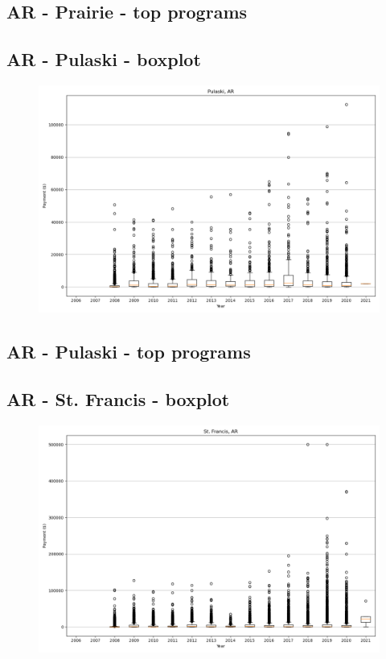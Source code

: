 \subsection*{AR - Prairie - top programs}

\newpage
\subsection*{AR - Pulaski - boxplot}
\begin{figure}[h]
\centering
\includegraphics[width=7in]{../output/boxplots/counties/Pulaski-AR_boxplot.png}
\end{figure}


\subsection*{AR - Pulaski - top programs}

\newpage
\subsection*{AR - St. Francis - boxplot}
\begin{figure}[h]
\centering
\includegraphics[width=7in]{../output/boxplots/counties/St. Francis-AR_boxplot.png}
\end{figure}


